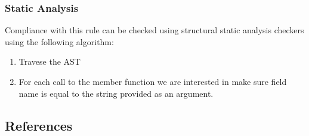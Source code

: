 \subsubsection{Static Analysis} 

Compliance with this rule can be checked using structural static analysis checkers using the following algorithm:

\begin{enumerate}
\item Travese the AST
\item For each call to the member function we are interested in make sure field name is equal to the string provided as an argument.
\end{enumerate}

\subsection{References}

